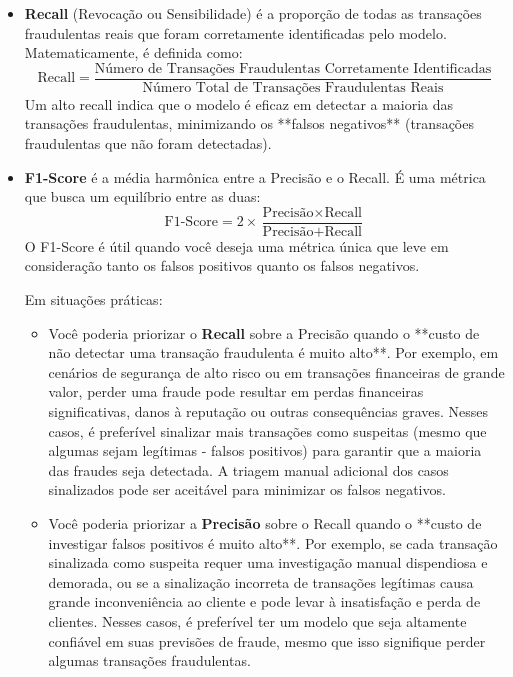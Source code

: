 \documentclass{article}
\begin{document}
\begin{enumerate}
\begin{itemize}
        \item \textbf{Recall} (Revocação ou Sensibilidade) é a proporção de todas as transações fraudulentas reais que foram corretamente identificadas pelo modelo. Matematicamente, é definida como:
        \[ \text{Recall} = \frac{\text{Número de Transações Fraudulentas Corretamente Identificadas}}{\text{Número Total de Transações Fraudulentas Reais}} \]
        Um alto recall indica que o modelo é eficaz em detectar a maioria das transações fraudulentas, minimizando os **falsos negativos** (transações fraudulentas que não foram detectadas).

        \item \textbf{F1-Score} é a média harmônica entre a Precisão e o Recall. É uma métrica que busca um equilíbrio entre as duas:
        \[ \text{F1-Score} = 2 \times \frac{\text{Precisão} \times \text{Recall}}{\text{Precisão} + \text{Recall}} \]
        O F1-Score é útil quando você deseja uma métrica única que leve em consideração tanto os falsos positivos quanto os falsos negativos.

        Em situações práticas:
        \begin{itemize}
            \item Você poderia priorizar o \textbf{Recall} sobre a Precisão quando o **custo de não detectar uma transação fraudulenta é muito alto**. Por exemplo, em cenários de segurança de alto risco ou em transações financeiras de grande valor, perder uma fraude pode resultar em perdas financeiras significativas, danos à reputação ou outras consequências graves. Nesses casos, é preferível sinalizar mais transações como suspeitas (mesmo que algumas sejam legítimas - falsos positivos) para garantir que a maioria das fraudes seja detectada. A triagem manual adicional dos casos sinalizados pode ser aceitável para minimizar os falsos negativos.

            \item Você poderia priorizar a \textbf{Precisão} sobre o Recall quando o **custo de investigar falsos positivos é muito alto**. Por exemplo, se cada transação sinalizada como suspeita requer uma investigação manual dispendiosa e demorada, ou se a sinalização incorreta de transações legítimas causa grande inconveniência ao cliente e pode levar à insatisfação e perda de clientes. Nesses casos, é preferível ter um modelo que seja altamente confiável em suas previsões de fraude, mesmo que isso signifique perder algumas transações fraudulentas.
        \end{itemize}
    \end{itemize}


\end{enumerate}
\end{document}
